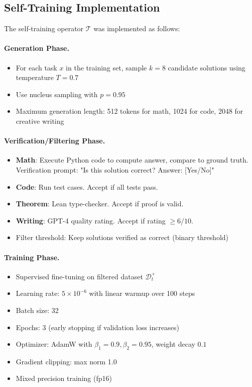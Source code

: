 \documentclass{article}
\theoremstyle{definition}
\theoremstyle{remark}
\newcommand{\D}{\mathcal{D}}
\newcommand{\T}{\mathcal{T}}
\begin{document}
\subsection{Self-Training Implementation}

The self-training operator \(\T\) was implemented as follows:

\paragraph{Generation Phase.}
\begin{itemize}
\item For each task \(x\) in the training set, sample \(k = 8\) candidate solutions using temperature \(T = 0.7\)
\item Use nucleus sampling with \(p = 0.95\)
\item Maximum generation length: 512 tokens for math, 1024 for code, 2048 for creative writing
\end{itemize}

\paragraph{Verification/Filtering Phase.}
\begin{itemize}
\item \textbf{Math}: Execute Python code to compute answer, compare to ground truth. Verification prompt: "Is this solution correct? Answer: [Yes/No]"
\item \textbf{Code}: Run test cases. Accept if all tests pass.
\item \textbf{Theorem}: Lean type-checker. Accept if proof is valid.
\item \textbf{Writing}: GPT-4 quality rating. Accept if rating \(\geq 6/10\).
\item Filter threshold: Keep solutions verified as correct (binary threshold)
\end{itemize}

\paragraph{Training Phase.}
\begin{itemize}
\item Supervised fine-tuning on filtered dataset \(\D_t^+\)
\item Learning rate: \(5 \times 10^{-6}\) with linear warmup over 100 steps
\item Batch size: 32
\item Epochs: 3 (early stopping if validation loss increases)
\item Optimizer: AdamW with \(\beta_1 = 0.9, \beta_2 = 0.95\), weight decay \(0.1\)
\item Gradient clipping: max norm 1.0
\item Mixed precision training (fp16)
\end{itemize}
\end{document}
